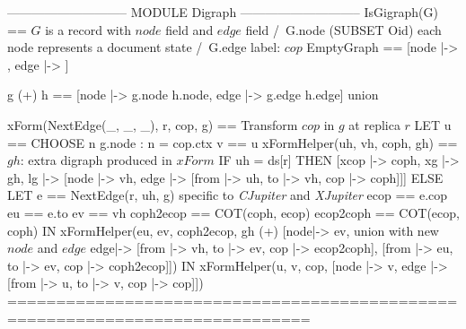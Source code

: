 \documentclass[preview, border={5pt 0pt 46pt 1pt}]{standalone}
\newcommand{\cjupiter}{\textsl{CJupiter}}
\newcommand{\xjupiter}{\textsl{XJupiter}}
\begin{document}
\begin{tla}
----------------------------- MODULE Digraph -----------------------------
IsGigraph(G) == \* $G$ is a record with $node$ field and $edge$ field
    /\ G.node \subseteq (SUBSET Oid) \* each node represents a document state
    /\ G.edge  \* label: $cop$
EmptyGraph == [node |-> {{}}, edge |-> {}]

g (+) h == [node |-> g.node \cup h.node, edge |-> g.edge \cup h.edge] \* union

xForm(NextEdge(_, _, _), r, cop, g) == \* Transform $cop$ in $g$ at replica $r$
    LET u == CHOOSE n \in g.node : n = cop.ctx    v == u 
        xFormHelper(uh, vh, coph, gh) == \* $gh$: extra digraph produced in $xForm$
            IF uh = ds[r] THEN [xcop |-> coph, xg |-> gh,
                 lg |-> [node |-> {vh}, edge |-> {[from |-> uh, to |-> vh, cop |-> coph]}]] 
            ELSE LET e == NextEdge(r, uh, g) \* specific to \cjupiter{} and \xjupiter{}
                  ecop == e.cop    eu == e.to    ev == vh 
             coph2ecop == COT(coph, ecop)    ecop2coph == COT(ecop, coph)
                 IN  xFormHelper(eu, ev, coph2ecop,
                       gh (+) [node|-> {ev}, \* union with new $node$ and $edge$
                               edge|-> {[from |-> vh, to |-> ev, cop |-> ecop2coph],
                                        [from |-> eu, to |-> ev, cop |-> coph2ecop]}])
    IN xFormHelper(u, v, cop, [node |-> {v}, edge |-> {[from |-> u, to |-> v, cop |-> cop]}])  
=============================================================================
\end{tla}
\end{document}

